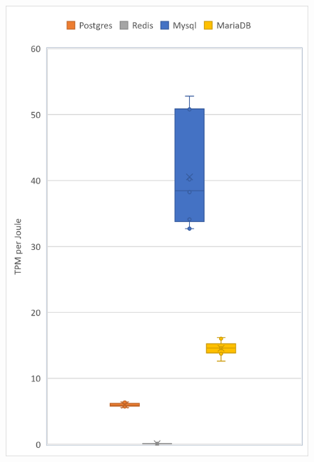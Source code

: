 \begin{figure}[h!]
\includegraphics[width=0.6\columnwidth]{results/boxplot/Disk-tpm.png}
\label{fig:bocplottrans}	
\end{figure}

